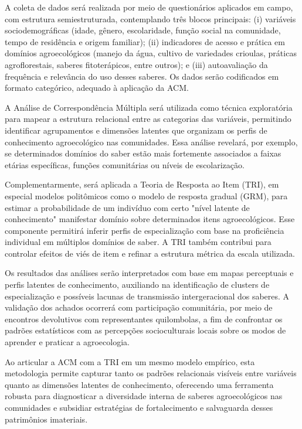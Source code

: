 A coleta de dados será realizada por meio de questionários aplicados em campo, com estrutura semiestruturada, contemplando três blocos principais: (i) variáveis sociodemográficas (idade, gênero, escolaridade, função social na comunidade, tempo de residência e origem familiar); (ii) indicadores de acesso e prática em domínios agroecológicos (manejo da água, cultivo de variedades crioulas, práticas agroflorestais, saberes fitoterápicos, entre outros); e (iii) autoavaliação da frequência e relevância do uso desses saberes. Os dados serão codificados em formato categórico, adequado à aplicação da ACM.

A Análise de Correspondência Múltipla será utilizada como técnica exploratória para mapear a estrutura relacional entre as categorias das variáveis, permitindo identificar agrupamentos e dimensões latentes que organizam os perfis de conhecimento agroecológico nas comunidades. Essa análise revelará, por exemplo, se determinados domínios do saber estão mais fortemente associados a faixas etárias específicas, funções comunitárias ou níveis de escolarização.

Complementarmente, será aplicada a Teoria de Resposta ao Item (TRI), em especial modelos politômicos como o modelo de resposta gradual (GRM), para estimar a probabilidade de um indivíduo com certo "nível latente de conhecimento" manifestar domínio sobre determinados itens agroecológicos. Esse componente permitirá inferir perfis de especialização com base na proficiência individual em múltiplos domínios de saber. A TRI também contribui para controlar efeitos de viés de item e refinar a estrutura métrica da escala utilizada.

Os resultados das análises serão interpretados com base em mapas perceptuais e perfis latentes de conhecimento, auxiliando na identificação de clusters de especialização e possíveis lacunas de transmissão intergeracional dos saberes. A validação dos achados ocorrerá com participação comunitária, por meio de encontros devolutivos com representantes quilombolas, a fim de confrontar os padrões estatísticos com as percepções socioculturais locais sobre os modos de aprender e praticar a agroecologia.

Ao articular a ACM com a TRI em um mesmo modelo empírico, esta metodologia permite capturar tanto os padrões relacionais visíveis entre variáveis quanto as dimensões latentes de conhecimento, oferecendo uma ferramenta robusta para diagnosticar a diversidade interna de saberes agroecológicos nas comunidades e subsidiar estratégias de fortalecimento e salvaguarda desses patrimônios imateriais.



